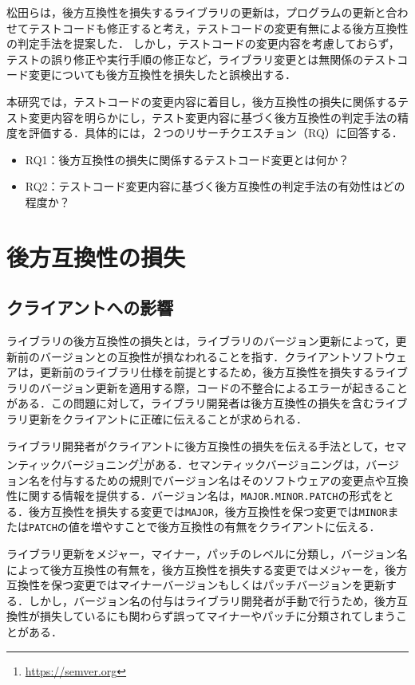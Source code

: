 \documentclass[11pt,dvipdfmx]{jreport}
\begin{document}
松田らは，後方互換性を損失するライブラリの更新は，プログラムの更新と合わせてテストコードも修正すると考え，テストコードの変更有無による後方互換性の判定手法を提案した．
\cite{matsuda}
しかし，テストコードの変更内容を考慮しておらず，テストの誤り修正や実行手順の修正など，ライブラリ変更とは無関係のテストコード変更についても後方互換性を損失したと誤検出する．

本研究では，テストコードの変更内容に着目し，後方互換性の損失に関係するテスト変更内容を明らかにし，テスト変更内容に基づく後方互換性の判定手法の精度を評価する．具体的には，２つのリサーチクエスチョン（RQ）に回答する．
 
\begin{itemize}
\item RQ1：後方互換性の損失に関係するテストコード変更とは何か？
\item RQ2：テストコード変更内容に基づく後方互換性の判定手法の有効性はどの程度か？
\end{itemize}

\chapter{後方互換性の損失}

\section{クライアントへの影響}
ライブラリの後方互換性の損失とは，ライブラリのバージョン更新によって，更新前のバージョンとの互換性が損なわれることを指す．クライアントソフトウェアは，更新前のライブラリ仕様を前提とするため，後方互換性を損失するライブラリのバージョン更新を適用する際，コードの不整合によるエラーが起きることがある．この問題に対して，ライブラリ開発者は後方互換性の損失を含むライブラリ更新をクライアントに正確に伝えることが求められる．

ライブラリ開発者がクライアントに後方互換性の損失を伝える手法として，セマンティックバージョニング\footnote{\url{https://semver.org}}がある．セマンティックバージョニングは，バージョン名を付与するための規則でバージョン名はそのソフトウェアの変更点や互換性に関する情報を提供する．バージョン名は，{\verb|MAJOR.MINOR.PATCH|}の形式をとる．後方互換性を損失する変更では{\verb|MAJOR|}，後方互換性を保つ変更では{\verb|MINOR|}または{\verb|PATCH|}の値を増やすことで後方互換性の有無をクライアントに伝える．

ライブラリ更新をメジャー，マイナー，パッチのレベルに分類し，バージョン名によって後方互換性の有無を，後方互換性を損失する変更ではメジャーを，後方互換性を保つ変更ではマイナーバージョンもしくはパッチバージョンを更新する．しかし，バージョン名の付与はライブラリ開発者が手動で行うため，後方互換性が損失しているにも関わらず誤ってマイナーやパッチに分類されてしまうことがある．
\end{document}
